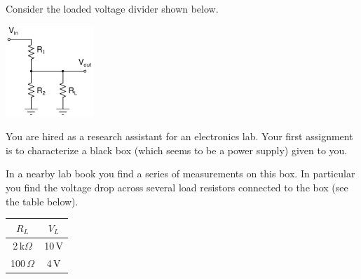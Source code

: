 \documentclass[letterpaper,addpoints,answers]{exam}
\begin{document}
\begin{questions}

\question

Consider the loaded voltage divider shown below.
\begin{center}
 \includegraphics[width=0.25\textwidth]{./schematics/loaded_voltage_divider}
\end{center}


\pagebreak

\question

You are hired as a research assistant for an electronics lab. Your first
assignment is to characterize a black box (which seems to be a power
supply) given to you.

In a nearby lab book you find a series of measurements on this box.
In particular you find the voltage drop across several load resistors
connected to the box (see the table below).

\begin{center}
 \begin{tabular}{|c|c|}
  \hline
   $R_L$         &  $V_L$ \\ 
  \hline
   2\,k$\Omega$  &  10\,V \\
   100\,$\Omega$ &  4\,V  \\
  \hline
 \end{tabular}
\end{center}
 

\end{questions}
\end{document}
